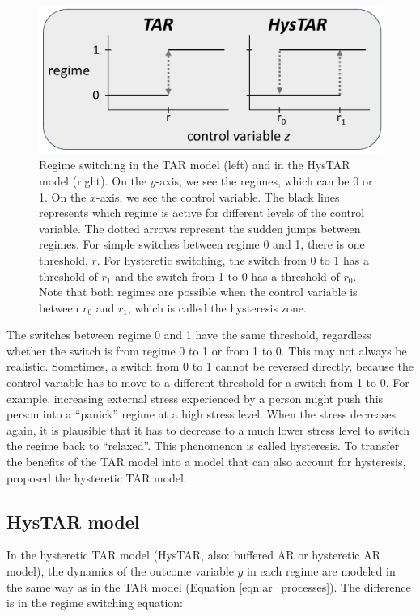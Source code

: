 \documentclass{article}
\begin{document}
\begin{figure}
\centering
\includegraphics[scale=0.4]{simple_vs_hysteretic_2}
\caption{Regime switching in the TAR model (left) and in the HysTAR model (right). On the $y$-axis, we see the regimes, which can be 0 or 1. On the $x$-axis, we see the control variable. 
The black lines represents which regime is active for different levels of the control variable. The dotted arrows represent the sudden jumps between regimes.
For simple switches between regime 0 and 1, there is one threshold, $r$. For hysteretic switching, the switch from 0 to 1 has a threshold of $r_1$ and the switch from 1 to 0 has a threshold of $r_0$. Note that both regimes are possible when the control variable is between $r_0$ and $r_1$, which is called the hysteresis zone.}
\label{fig:simple_vs_hysteretic_2}
\end{figure}

The switches between regime 0 and 1 have the same threshold, regardless whether the switch is from regime 0 to 1 or from 1 to 0. 
This may not always be realistic. Sometimes, a switch from 0 to 1 cannot be reversed directly, because the control variable has to move to a different threshold  for a switch from 1 to 0.
For example, increasing external stress experienced by a person might push this person into a ``panick'' regime at a high stress level.
When the stress decreases again, it is plausible that it has to decrease to a much lower stress level to switch the regime back to ``relaxed''.
This phenomenon is called hysteresis.
To transfer the benefits of the TAR model into a model that can also account for hysteresis, \citet{bar2} proposed the hysteretic TAR model.

\subsection{HysTAR model}
In the hysteretic TAR model (HysTAR, also: buffered AR or hysteretic AR model), the dynamics of the outcome variable $y$ in each regime are modeled in the same way as in the TAR model (Equation \ref{eqn:ar_processes}). The difference is in the regime switching equation:
\end{document}
